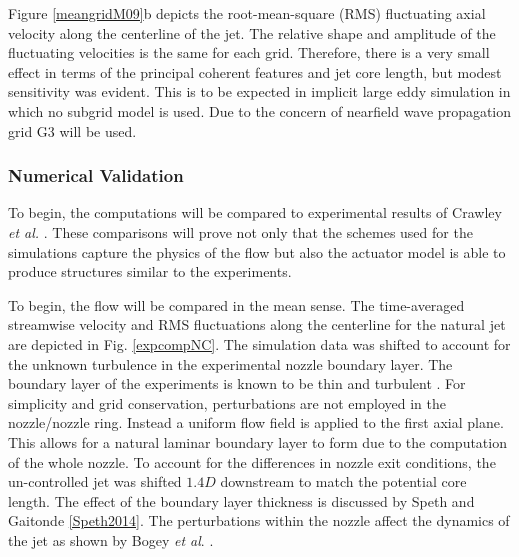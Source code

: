 \documentclass[english]{aiaa-tc}
\begin{document}
Figure \ref{meangridM09}b depicts the root-mean-square (RMS) fluctuating axial velocity along the centerline of the jet. The relative shape and amplitude of the fluctuating velocities is the same for each grid. Therefore, there is a very small
effect in terms of the principal coherent features and jet core
length, but modest sensitivity was evident. This is to be expected in implicit large eddy simulation in which no subgrid model is used. Due to the concern of nearfield wave propagation grid G3 will be used.


\subsubsection{Numerical Validation}
To begin, the computations will be compared to experimental results of Crawley {\em et al.} \cite{Crawley2014}. These comparisons will prove not only that the schemes used for the simulations capture the physics of the flow but also the actuator model is able to produce structures similar to the experiments.

To begin, the flow will be compared in the mean sense. The time-averaged streamwise velocity and RMS fluctuations along the centerline for the natural jet are depicted in Fig. \ref{expcompNC}. The simulation data was shifted to account for the unknown turbulence in the experimental nozzle boundary layer.
The boundary layer of the experiments is known to be thin and turbulent \cite{kastnerj2009-1}.
For simplicity and grid conservation, perturbations are not employed in the nozzle/nozzle ring. Instead a uniform flow field is applied to the first axial plane. This allows for a natural laminar boundary layer to form due to the computation of the whole nozzle. To account for the differences in nozzle exit conditions, the  un-controlled jet was shifted $1.4D$ downstream to match the potential core length. The effect of the boundary layer thickness is discussed by Speth and Gaitonde \ref{Speth2014}. The perturbations within the nozzle affect the dynamics of the jet as shown by Bogey {\em et al}. \cite{bogey2012}.
\end{document}
